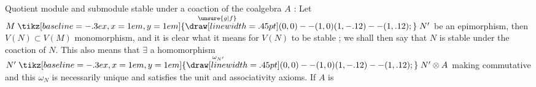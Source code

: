 Quotient module and submodule stable under a coaction of the coalgebra $A$ : Let $M\overset{\unsure{g|f}}{\mathrel{\tikz[baseline=-.3ex,x=1em,y=1em]{\draw[line width=.45pt] (0,0)--(1,0) (1,-.12)--(1,.12);}}}N'$ be an epimorphism, then $V(N)\subset V(M)$ monomorphism, and it is clear what it means for $V(N)$ to be stable ; we shall then say that $N$ is stable under the coaction of $N$. This also means that $\exists$ a homomorphism $N'\overset{\omega_{N'}}{\mathrel{\tikz[baseline=-.3ex,x=1em,y=1em]{\draw[line width=.45pt] (0,0)--(1,0) (1,-.12)--(1,.12);}}}N'\otimes A$ making commutative
and this $\omega_{N}$ is necessarily unique and satisfies the unit and associativity axioms. If $A$ is 
